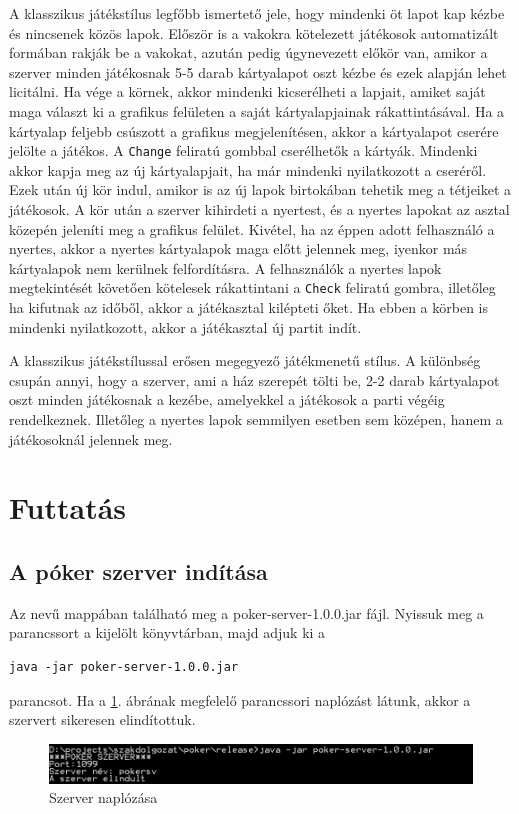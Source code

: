 A klasszikus játékstílus legfőbb ismertető jele, hogy mindenki öt lapot kap kézbe és nincsenek közös lapok. Először is a vakokra kötelezett játékosok automatizált formában rakják be a vakokat, azután pedig úgynevezett előkör van, amikor a szerver minden játékosnak 5-5 darab kártyalapot oszt kézbe és ezek alapján lehet licitálni. Ha vége a körnek, akkor mindenki kicserélheti a lapjait, amiket saját maga választ ki a grafikus felületen a saját kártyalapjainak rákattintásával. Ha a kártyalap feljebb csúszott a grafikus megjelenítésen, akkor a kártyalapot cserére jelölte a játékos. A \texttt{Change} feliratú gombbal cserélhetők a kártyák. Mindenki akkor kapja meg az új kártyalapjait, ha már mindenki nyilatkozott a cseréről. Ezek után új kör indul, amikor is az új lapok birtokában tehetik meg a tétjeiket a játékosok. A kör után a szerver kihirdeti a nyertest, és a nyertes lapokat az asztal közepén jeleníti meg a grafikus felület. Kivétel, ha az éppen adott felhasználó a nyertes, akkor a nyertes kártyalapok maga előtt jelennek meg, iyenkor más kártyalapok nem kerülnek felfordításra. A felhasználók a nyertes lapok megtekintését követően kötelesek rákattintani a \texttt{Check} feliratú gombra, illetőleg ha kifutnak az időből, akkor a játékasztal kilépteti őket. Ha ebben a körben is mindenki nyilatkozott, akkor a játékasztal új partit indít.

A klasszikus játékstílussal erősen megegyező játékmenetű stílus. A különbség csupán annyi, hogy a szerver, ami a ház szerepét tölti be, 2-2 darab kártyalapot oszt minden játékosnak a kezébe, amelyekkel a játékosok a parti végéig rendelkeznek. Illetőleg a nyertes lapok semmilyen esetben sem középen, hanem a játékosoknál jelennek meg.

\section{Futtatás}

\subsection{A póker szerver indítása}
Az  nevű mappában található meg  a poker-server-1.0.0.jar fájl. Nyissuk meg a parancssort a kijelölt könyvtárban, majd adjuk ki a
 \begin{Verbatim}[xleftmargin=.5in]
java -jar poker-server-1.0.0.jar
\end{Verbatim}
parancsot. Ha a \ref{fig:server_started}. ábrának megfelelő parancssori naplózást látunk, akkor a szervert sikeresen elindítottuk.
\begin{figure}[h!]
  \caption{Szerver naplózása}
  \label{fig:server_started}
  \centering
    \includegraphics[width=\linewidth]{user-documentation/images/server_started.jpg}
\end{figure}

